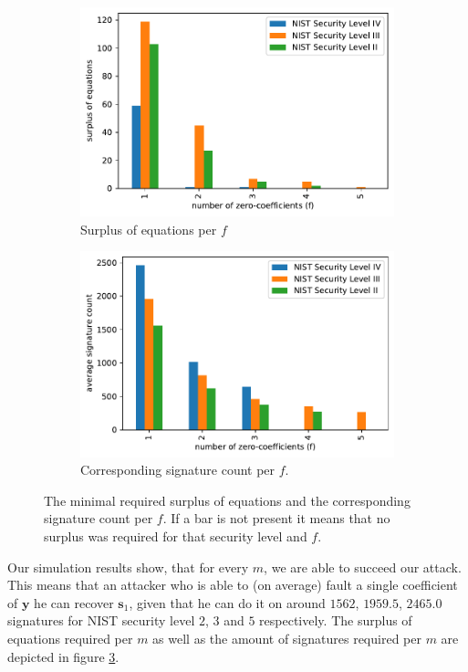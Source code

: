 \documentclass[a4paper,titlepage]{article}
\begin{document}
\begin{figure}%
	\centering%
	\begin{subfigure}{.5\textwidth}%
		\centering%
		\includegraphics[width=.95\linewidth]{plots/dilithium_surplus}%
		\caption{Surplus of equations per $f$}%
		\label{fig:dilithiumsurplus}%
	\end{subfigure}%
	\begin{subfigure}{.5\textwidth}%
		\centering%
		\includegraphics[width=.95\linewidth]{plots/dilithium_sigcount_upper}%
		\caption{Corresponding signature count per $f$.}%
		\label{fig:dilithiumsigcountsurplus}%
	\end{subfigure}%
%
	\caption{The minimal required surplus of equations and the corresponding signature count per $f$. If a bar is not present it means that no surplus was required for that security level and $f$.}
	\label{fig:dilithiumsigcountsurplus}%
\end{figure}

Our simulation results show, that for every $m$, we are able to succeed our attack.
This means that an attacker who is able to (on average) fault a single coefficient of $\bm{y}$ he can recover $\bm{s}_{1}$, given that he can do it on around $1562$,  $1959.5$, $2465.0$ signatures for NIST security level $2$, $3$ and $5$ respectively. The surplus of equations required per $m$ as well as the amount of signatures required per $m$ are depicted in figure \ref{fig:dilithiumsigcountsurplus}.
\end{document}
